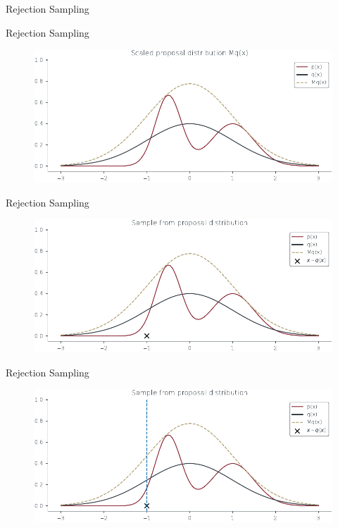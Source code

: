 \documentclass{beamer}
\begin{document}
\begin{section}{Rejection Sampling}
    \begin{frame}{Rejection Sampling}
        \begin{figure}
            \centering
            \includegraphics[scale = 0.75]{../figures/sampling/rejection-sampling--1.0-True-True-False-False-False-False-False-False.pdf}
        \end{figure}
    \end{frame}

    \begin{frame}{Rejection Sampling}
        \begin{figure}
            \centering
            \includegraphics[scale = 0.75]{../figures/sampling/rejection-sampling--1.0-True-True-True-False-False-False-False-False.pdf}
        \end{figure}
    \end{frame}

    \begin{frame}{Rejection Sampling}
        \begin{figure}
            \centering
            \includegraphics[scale = 0.75]{../figures/sampling/rejection-sampling--1.0-True-True-True-True-False-False-False-False.pdf}
        \end{figure}
    \end{frame}


\end{section}
\end{document}
